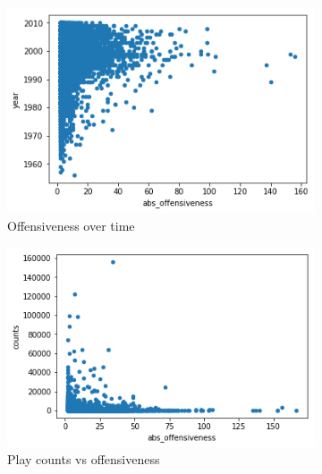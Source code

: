 \documentclass[11pt]{article}
\begin{document}
\begin{figure}
\begin{subfigure}[b]{0.45\textwidth}
\centering
\includegraphics[width=\textwidth]{plots/scatter_off_time_2}
\caption{Offensiveness over time}
\label{scatter_off_time_2}
\end{subfigure}
\quad
\begin{subfigure}[b]{0.45\textwidth}
\centering
\includegraphics[width=\textwidth]{plots/scatter_off_counts_2}
\caption{Play counts vs offensiveness}
\label{scatter_off_counts_2}
\end{subfigure}

\centering
\begin{subfigure}[b]{0.45\textwidth}
\centering


\end{subfigure}
\end{figure}
\end{document}
